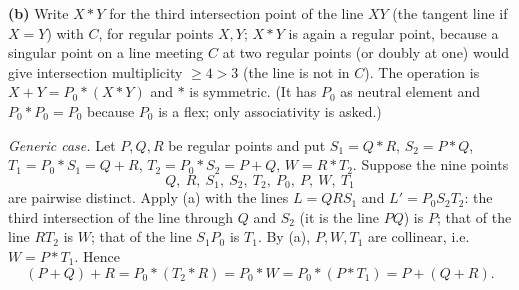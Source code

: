 \documentclass[11pt]{article}
\begin{document}
\textbf{(b)} Write $X*Y$ for the third intersection point of the line $XY$ (the tangent line if $X=Y$) with $C$, for regular points $X,Y$; $X*Y$ is again a regular point, because a singular point on a line meeting $C$ at two regular points (or doubly at one) would give intersection multiplicity $\ge 4>3$ (the line is not in $C$). The operation is $X+Y=P_0*(X*Y)$ and $*$ is symmetric. (It has $P_0$ as neutral element and $P_0*P_0=P_0$ because $P_0$ is a flex; only associativity is asked.)

\emph{Generic case.} Let $P,Q,R$ be regular points and put $S_1=Q*R$, $S_2=P*Q$, $T_1=P_0*S_1=Q+R$, $T_2=P_0*S_2=P+Q$, $W=R*T_2$. Suppose the nine points
\[
Q,\ R,\ S_1,\ S_2,\ T_2,\ P_0,\ P,\ W,\ T_1
\]
are pairwise distinct. Apply (a) with the lines $L=QRS_1$ and $L'=P_0S_2T_2$: the third intersection of the line through $Q$ and $S_2$ (it is the line $PQ$) is $P$; that of the line $RT_2$ is $W$; that of the line $S_1P_0$ is $T_1$. By (a), $P,W,T_1$ are collinear, i.e.\ $W=P*T_1$. Hence
\[
(P+Q)+R=P_0*(T_2*R)=P_0*W=P_0*(P*T_1)=P+(Q+R).
\]
\end{document}
